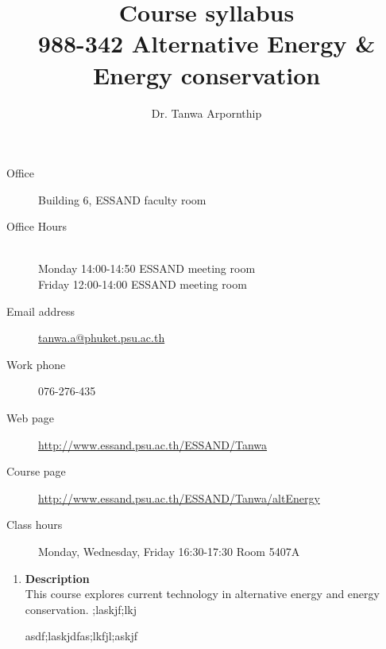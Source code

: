 \documentclass[a4paper,12pt]{article}
\begin{document}

\title{Course syllabus\\ \large 988-342 Alternative Energy \& Energy conservation}
\author{Dr. Tanwa Arpornthip}
\date{}


\maketitle

\noindent\makebox[\linewidth]{\rule{\linewidth}{0.4pt}}
\begin{description}
\item [Office] Building 6, ESSAND faculty room
\item [Office Hours] \hfill \\
    Monday 14:00-14:50 ESSAND meeting room \hfill\\
    Friday 12:00-14:00 ESSAND meeting room
\item [Email address] \href{mailto:tanwa.a@phuket.psu.ac.th}{tanwa.a@phuket.psu.ac.th}
\item [Work phone] 076-276-435
\item [Web page] \href{http://www.essand.psu.ac.th/ESSAND/Tanwa}{http://www.essand.psu.ac.th/ESSAND/Tanwa}
\item [Course page] \href{http://www.essand.psu.ac.th/ESSAND/Tanwa/altEnergy}{http://www.essand.psu.ac.th/ESSAND/Tanwa/altEnergy}
\item [Class hours] Monday, Wednesday, Friday 16:30-17:30 Room 5407A
\end{description}
\noindent\makebox[\linewidth]{\rule{\linewidth}{0.4pt}}

\begin{enumerate}
    \item \textbf{Description} \hfill \\

    This course explores current technology in alternative energy and energy conservation.
    ;laskjf;lkj

    asdf;laskjdfas;lkfjl;askjf
\end{enumerate}
\end{document}
